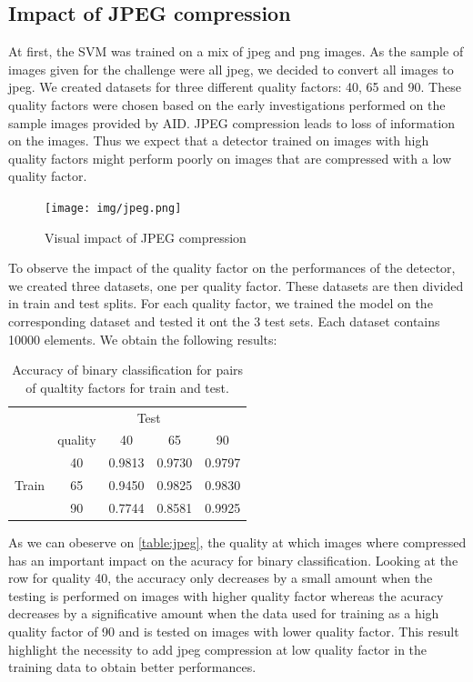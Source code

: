 \documentclass[12pt,a4paper]{article}
\begin{document}
\subsection{Impact of JPEG compression}
At first, the SVM was trained on a mix of jpeg and png images. As the sample of images given for the challenge were all jpeg, we decided to convert all images to jpeg. We created datasets for three different quality factors: 40, 65 and 90. These quality factors were chosen based on the early investigations performed on the sample images provided by AID. JPEG compression leads to loss of information on the images. Thus we expect that a detector trained on images with high quality factors might perform poorly on  images that are compressed with a low quality factor. 
\begin{figure}[H]
    \texttt{[image: img/jpeg.png]}
    \vspace*{-.8cm}
    \caption{Visual impact of JPEG compression}
\end{figure}

To observe the impact of the quality factor on the performances of the detector, we created three datasets, one per quality factor. These datasets are then divided in train and test splits. For each quality factor, we trained the model on the corresponding dataset and tested it ont the 3 test sets. Each dataset contains 10000 elements. We obtain the following results:
\begin{table}[H]
    \centering
    \begin{tabular}{|c|c|c|c|c|}
    \hline
    & \multicolumn{4}{c|}{Test} \\
    \cline{2-5}
     & quality & 40 & 65 & 90 \\
    \hline
    \multirow{3}{*}{Train} & 40 & 0.9813 & 0.9730 & 0.9797 \\
     \cline{2-5}
     & 65 & 0.9450 & 0.9825 & 0.9830 \\
     \cline{2-5}
     & 90 & 0.7744 & 0.8581 & 0.9925 \\
    \hline
    \end{tabular}
    \caption{Accuracy of binary classification for pairs of qualtity factors for train and test.}
    \label{table:jpeg}
\end{table}

As we can obeserve on \autoref*{table:jpeg}, the quality at which images where compressed has an important impact on the acuracy for binary classification. Looking at the row for quality 40, the accuracy only decreases by a small amount when the testing is performed on images with higher quality factor whereas the acuracy decreases by a significative amount when the data used for training as a high quality factor of 90 and is tested on images with lower quality factor. This result highlight the necessity to add jpeg compression at low quality factor in the training data to obtain better performances.
\end{document}

